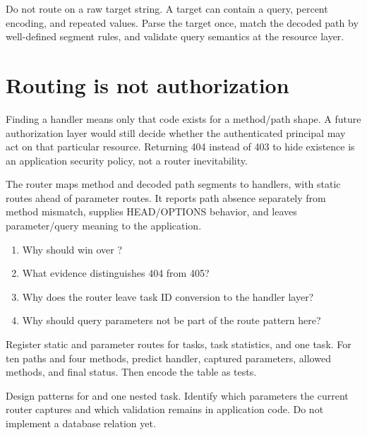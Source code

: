 \begin{pitfall}
Do not route on a raw target string. A target can contain a query, percent
encoding, and repeated values. Parse the target once, match the decoded path by
well-defined segment rules, and validate query semantics at the resource layer.
\end{pitfall}

\section{Routing is not authorization}

Finding a handler means only that code exists for a method/path shape. A future
authorization layer would still decide whether the authenticated principal may
act on that particular resource. Returning 404 instead of 403 to hide existence
is an application security policy, not a router inevitability.

\summarytitle

The router maps method and decoded path segments to handlers, with static routes
ahead of parameter routes. It reports path absence separately from method
mismatch, supplies HEAD/OPTIONS behavior, and leaves parameter/query meaning to
the application.

\reviewtitle
\begin{enumerate}
  \item Why should  win over ?
  \item What evidence distinguishes 404 from 405?
  \item Why does the router leave task ID conversion to the handler layer?
  \item Why should query parameters not be part of the route pattern here?
\end{enumerate}

\begin{exercise}
Register static and parameter routes for tasks, task statistics, and one task.
For ten paths and four methods, predict handler, captured parameters, allowed
methods, and final status. Then encode the table as tests.
\end{exercise}

\begin{exercise}
Design patterns for  and one nested task.
Identify which parameters the current router captures and which validation remains
in application code. Do not implement a database relation yet.
\end{exercise}
